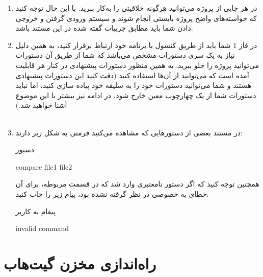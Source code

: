 \documentclass[]{article}
\begin{document}
\begin{enumerate}[label={نکته \arabic*:}]
\item
در هر جایی از پروژه می‌توانید هرگونه خلاقیتی را به‌کار ببرید. با این حال توجه کنید که خواسته‌های واضح پروژه بایستی انجام شوند و سیستم ورودی گرفتن و خروجی دادن شما باید مطابق جزییات گفته شده در این مستند باشد.


\item در فاز 1 شما باید از طریق کنسول با برنامه خود ارتباط برقرار کنید، به همین دلیل نیاز به یک سری دستورات مشخص می‌باشد که شما از طریق آن دستورات می‌توانید پروژه را جلو ببرید. به همین منظور دستورات پیشنهادی در کنار هر قابلیت آمده است که می‌توانید از آن‌ها استفاده کنید (دقت کنید این دستورات پیشنهادی هستند و شما می‌توانید دستورات خود را به سلیقه خود پیاده سازی کنید، اما نباید دستورات شما از یک چهارچوب معین خارج شود، در ادامه نیز بیشتر با این موضوع آشنا خواهید شد.)
\\\\
\item
در مستند بعضی از دستور‌هایی که مشاهده می‌کنید فرمتی به شکل زیر دارند:

\begin{mybox}[colback=yellow]{دستور}
	
	
	\begin{latin}
		
	compare file1 file2
		
	\end{latin}
	
\end{mybox}
همچنین توجه کنید که اگر دستور نامعتبری وارد شد که در قسمت مربوطه، برای آن خطای به خصوصی در نظر گرفته نشده بود، پیام زیر را چاپ کنید:

\begin{mybox}[colback=yellow]{پیغام به کاربر}
	
	
	\begin{latin}
		
	invalid command
		
	\end{latin}
	
\end{mybox}


\end{enumerate}




\newpage


\section*{{\titr راه‌اندازی مخزن گیت‌هاب}}
\end{document}
